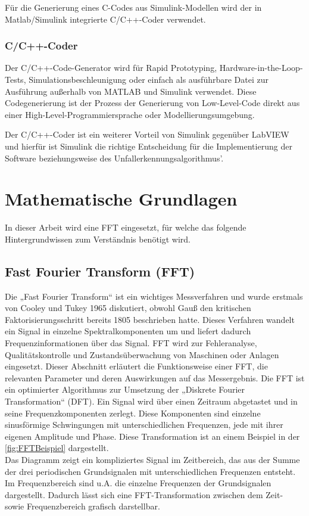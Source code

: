Für die Generierung eines C-Codes aus Simulink-Modellen wird der in Matlab/Simulink integrierte C/C++-Coder verwendet.

\subsubsection{C/C++-Coder}
Der C/C++-Code-Generator wird für Rapid Prototyping, Hardware-in-the-Loop-Tests, Simulationsbeschleunigung oder einfach als ausführbare Datei zur Ausführung außerhalb von MATLAB und Simulink verwendet.
Diese Codegenerierung ist der Prozess der Generierung von Low-Level-Code direkt aus einer High-Level-Programmiersprache oder Modellierungsumgebung.

Der C/C++-Coder ist ein weiterer Vorteil von Simulink gegenüber LabVIEW und hierfür ist Simulink die richtige Entscheidung für die Implementierung der Software beziehungsweise des Unfallerkennungsalgorithmus'.






\section{Mathematische Grundlagen}

In dieser Arbeit wird eine FFT eingesetzt, für welche das folgende Hintergrundwissen zum Verständnis benötigt wird.
\subsection{Fast Fourier Transform (FFT)} \label{abs:FFT}

Die „Fast Fourier Transform“ ist ein wichtiges Messverfahren und wurde erstmals von Cooley und Tukey 1965 diskutiert, obwohl Gauß den kritischen Faktorisierungsschritt bereits 1805 beschrieben hatte. Dieses Verfahren wandelt ein Signal in einzelne Spektralkomponenten um und liefert dadurch Frequenzinformationen über das Signal. FFT wird zur Fehleranalyse, Qualitätskontrolle und Zustandsüberwachung von Maschinen oder Anlagen eingesetzt. Dieser Abschnitt erläutert die Funktionsweise einer FFT, die relevanten Parameter und deren Auswirkungen auf das Messergebnis.
Die FFT ist ein optimierter Algorithmus zur Umsetzung der „Diskrete Fourier Transformation“ (DFT). Ein Signal wird über einen Zeitraum abgetastet und in seine Frequenzkomponenten zerlegt. Diese Komponenten sind einzelne sinusförmige Schwingungen mit unterschiedlichen Frequenzen, jede mit ihrer eigenen Amplitude und Phase. Diese Transformation ist an einem Beispiel in der \autoref{fig:FFTBeispiel} dargestellt.\\
Das Diagramm zeigt ein kompliziertes Signal im Zeitbereich, das aus der Summe der drei periodischen Grundsignalen mit unterschiedlichen Frequenzen entsteht. Im Frequenzbereich sind u.A. die einzelne Frequenzen der Grundsignalen dargestellt. Dadurch lässt sich eine FFT-Transformation zwischen dem Zeit- sowie Frequenzbereich grafisch darstellbar.

